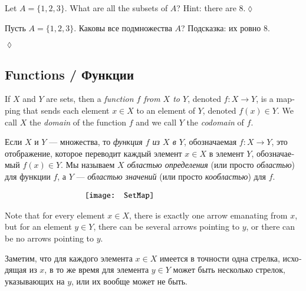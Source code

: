 \documentclass{book}
\def\to{\rightarrow}
\def\taking{\colon}
\theoremstyle{theoremENG}
\theoremstyle{lemmaENG}
\theoremstyle{propositionENG}
\theoremstyle{corollaryENG}
\theoremstyle{factENG}
\theoremstyle{remarkENG}
\theoremstyle{exampleENG}
\theoremstyle{warningENG}
\theoremstyle{questionENG}
\theoremstyle{guessENG}
\theoremstyle{answerENG}
\theoremstyle{constructionENG}
\theoremstyle{rulesENG}
\theoremstyle{excENG}
\newtheorem{excENG}[subsubsection]{\begin{english}Exercise\end{english}}
\theoremstyle{appENG}
\theoremstyle{definitionENG}
\theoremstyle{notationENG}
\theoremstyle{conjectureENG}
\theoremstyle{postulateENG}
\newenvironment{exerciseENG}{\begin{excENG}}{\hspace*{\fill}$\lozenge$\end{excENG}}
\theoremstyle{theoremRUS}
\theoremstyle{lemmaRUS}
\theoremstyle{propositionRUS}
\theoremstyle{corollaryRUS}
\theoremstyle{factRUS}
\theoremstyle{remarkRUS}
\theoremstyle{exampleRUS}
\theoremstyle{warningRUS}
\theoremstyle{questionRUS}
\theoremstyle{guessRUS}
\theoremstyle{answerRUS}
\theoremstyle{constructionRUS}
\theoremstyle{rulesRUS}
\theoremstyle{excRUS}
\newtheorem{excRUS}[subsubsection]{\begin{russian}Упражнение\end{russian}}
\theoremstyle{appRUS}
\theoremstyle{definitionRUS}
\theoremstyle{notationRUS}
\theoremstyle{conjectureRUS}
\theoremstyle{postulateRUS}
\newenvironment{exerciseRUS}{\begin{excRUS}}{\hspace*{\fill}$\lozenge$\end{excRUS}}
\begin{document}
\begin{english}
\begin{exerciseENG}Let $A=\{1,2,3\}$. What are all the subsets of $A$? Hint: there are 8.\end{exerciseENG}
\begin{exerciseRUS}\begin{russian}Пусть $A=\{1,2,3\}$. Каковы все подмножества $A$? Подсказка: их ровно $8$. \end{russian}\end{exerciseRUS}


\subsection{Functions / Функции}\label{sec:functions}

If $X$ and $Y$ are sets, then a {\em function $f$ from $X$ to $Y$}, denoted $f\taking X\to Y$, is a mapping that sends each element $x\in X$ to an element of $Y$, denoted $f(x)\in Y$. We call $X$ the {\em domain} of the function $f$ and we call $Y$ the {\em codomain} of $f$. 

\begin{russian}Если $X$ и $Y$ — множества, то {\em функция $f$ из $X$ в $Y$}, обозначаемая $f\taking X\to Y$, это отображение, которое переводит каждый элемент $x\in X$ в элемент $Y$, обозначаемый $f(x)\in Y$. Мы называем $X$ {\em областью определения} (или просто {\em областью}) для функции $f$, а $Y$ — {\em областью значений} (или просто {\em кообластью}) для $f$.  \end{russian}

\begin{align}\label{dia:setmap}
\parbox{2.3in}{\texttt{[image: SetMap]}}
\end{align}

Note that for every element $x\in X$, there is exactly one arrow emanating from $x$, but for an element $y\in Y$, there can be several arrows pointing to $y$, or there can be no arrows pointing to $y$. 

\begin{russian}Заметим, что для каждого элемента $x\in X$ имеется в точности одна стрелка, исходящая из $x$, в то же время для элемента $y\in Y$ может быть несколько стрелок, указывающих на $y$, или их вообще может не быть.\end{russian}


\end{english}
\end{document}

